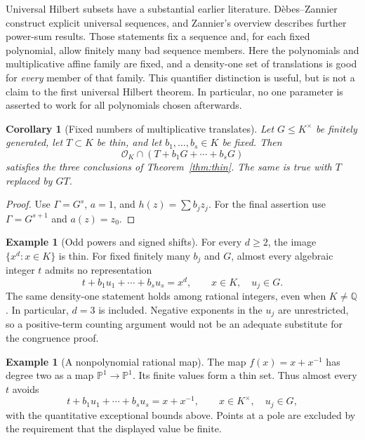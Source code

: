\documentclass[11pt,a4paper]{article}
\newtheorem{corollary}[theorem]{Corollary}
\theoremstyle{definition}
\newtheorem{example}[theorem]{Example}
\theoremstyle{remark}
\newcommand{\Q}{\mathbb Q}
\newcommand{\Pone}{\mathbb P^1}
\newcommand{\OK}{\mathcal O_K}
\begin{document}
Universal Hilbert subsets have a substantial earlier literature.
D\`ebes--Zannier \cite{DZ} construct explicit universal sequences, and
Zannier's overview \cite[Theorem~H]{Zannier} describes further power-sum
results. Those statements fix a sequence and, for each fixed polynomial,
allow finitely many bad sequence members. Here the polynomials and
multiplicative affine family are fixed, and a density-one set of
translations is good for \emph{every} member of that family. This
quantifier distinction is useful, but is not a claim to the first
universal Hilbert theorem. In particular, no one parameter is asserted
to work for all polynomials chosen afterwards.

\begin{corollary}[Fixed numbers of multiplicative translates]\label{cor:sum}
Let $G\le K^\times$ be finitely generated, let $T\subset K$ be thin,
and let $b_1,\ldots,b_s\in K$ be fixed. Then
\[
 \OK\cap(T+b_1G+\cdots+b_sG)
\]
satisfies the three conclusions of Theorem~\ref{thm:thin}. The same is
true with $T$ replaced by $GT$.
\end{corollary}
\begin{proof}
Use $\Gamma=G^s$, $a=1$, and $h(z)=\sum b_jz_j$. For the final
assertion use $\Gamma=G^{s+1}$ and $a(z)=z_0$.
\end{proof}

\begin{example}[Odd powers and signed shifts]\label{ex:odd}
For every $d\ge2$, the image $\{x^d:x\in K\}$ is thin. For fixed
finitely many $b_j$ and $G$, almost every algebraic integer $t$ admits
no representation
\[
 t+b_1u_1+\cdots+b_su_s=x^d,
 \qquad x\in K,\quad u_j\in G.
\]
The same density-one statement holds among rational integers, even when
$K\ne\Q$. In particular, $d=3$ is included. Negative exponents in the
$u_j$ are unrestricted, so a positive-term counting argument would not
be an adequate substitute for the congruence proof.
\end{example}

\begin{example}[A nonpolynomial rational map]
The map $f(x)=x+x^{-1}$ has degree two as a map $\Pone\to\Pone$.
Its finite values form a thin set. Thus almost every $t$ avoids
\[
 t+b_1u_1+\cdots+b_su_s=x+x^{-1},
 \qquad x\in K^\times,\quad u_j\in G,
\]
with the quantitative exceptional bounds above. Points at a pole are
excluded by the requirement that the displayed value be finite.
\end{example}
\end{document}
